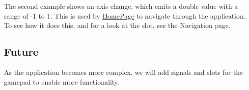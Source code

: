 The second example shows an axis change, which emits a double value with a range of -\/1 to 1. This is used by \mbox{\hyperlink{classHomePage}{Home\+Page}} to navigate through the application. To see how it does this, and for a look at the slot, see the Navigation page.

\subsection*{Future}

As the application becomes more complex, we will add signals and slots for the gamepad to enable more functionality. 